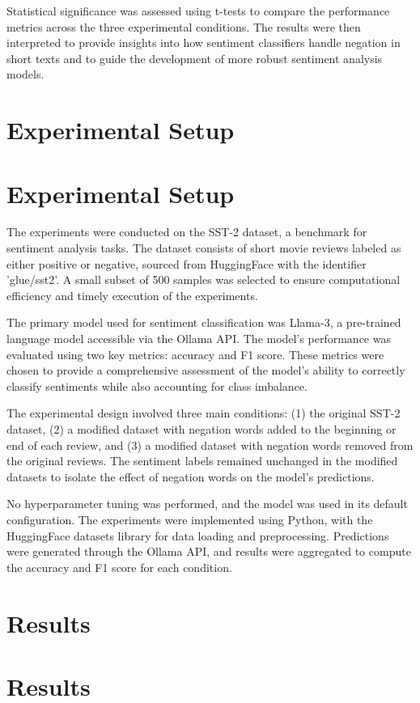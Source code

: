 \documentclass{article}
\begin{document}
Statistical significance was assessed using t-tests to compare the performance metrics across the three experimental conditions. The results were then interpreted to provide insights into how sentiment classifiers handle negation in short texts and to guide the development of more robust sentiment analysis models.
\section{Experimental Setup}
\section{Experimental Setup}

The experiments were conducted on the SST-2 dataset, a benchmark for sentiment analysis tasks. The dataset consists of short movie reviews labeled as either positive or negative, sourced from HuggingFace with the identifier 'glue/sst2'. A small subset of 500 samples was selected to ensure computational efficiency and timely execution of the experiments.

The primary model used for sentiment classification was Llama-3, a pre-trained language model accessible via the Ollama API. The model's performance was evaluated using two key metrics: accuracy and F1 score. These metrics were chosen to provide a comprehensive assessment of the model's ability to correctly classify sentiments while also accounting for class imbalance.

The experimental design involved three main conditions: (1) the original SST-2 dataset, (2) a modified dataset with negation words added to the beginning or end of each review, and (3) a modified dataset with negation words removed from the original reviews. The sentiment labels remained unchanged in the modified datasets to isolate the effect of negation words on the model's predictions.

No hyperparameter tuning was performed, and the model was used in its default configuration. The experiments were implemented using Python, with the HuggingFace datasets library for data loading and preprocessing. Predictions were generated through the Ollama API, and results were aggregated to compute the accuracy and F1 score for each condition.
\section{Results}
\section{Results}
\end{document}
